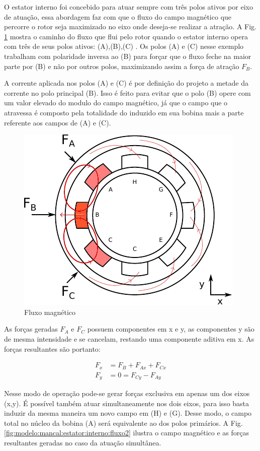 O estator interno foi concebido para atuar sempre com três polos ativos por eixo de atuação, essa abordagem faz com que o fluxo do campo magnético que percorre o rotor seja maximizado no eixo onde deseja-se realizar a atração. A Fig. \ref{fig:modelo:mancal:estator:interno:fluxo} mostra o caminho do fluxo que flui pelo rotor quando o estator interno opera com três de seus polos ativos: (A),(B),(C) . Os polos (A) e (C) nesse exemplo trabalham com polaridade inversa ao (B) para forçar que o fluxo feche na maior parte por (B) e não por outros polos, maximizando assim a força de atração $F_B$. 

A corrente aplicada nos polos (A) e (C) é por definição do projeto a metade da corrente no polo principal (B). Isso é feito para evitar que o polo (B) opere com um valor elevado do modulo do campo magnético, já que o campo que o atravessa é composto pela totalidade do induzido em sua bobina mais a parte referente aos campos de (A) e (C).

\begin{figure}[ht!]
	\centering
	\includegraphics[width=0.7\linewidth]{./Figs/modelo_mancal_estator_interno_fluxo}
	\caption{Fluxo magnético}
	\label{fig:modelo:mancal:estator:interno:fluxo}
\end{figure}

As forças geradas $F_A$ e $F_C$ possuem componentes em x e y, as componentes y são de mesma intensidade e se cancelam, restando uma componente aditiva em x. As forças resultantes são portanto:

\begin{align}
 	F_x &= F_B + F_{Ax} + F_{Cx} \\
 	F_y &= 0 = F_{Cy} - F_{Ay} 
\end{align}


Nesse modo de operação pode-se gerar forças exclusiva em apenas um dos eixos (x,y). É possível também atuar simultaneamente nos dois eixos, para isso basta induzir da mesma maneira um novo campo em (H) e (G). Desse modo, o campo total no núcleo da bobina (A) será equivalente ao dos polos primários. A Fig. \ref{fig:modelo:mancal:estator:interno:fluxo2} ilustra o campo magnético e as forças resultantes geradas no caso da atuação simultânea.

